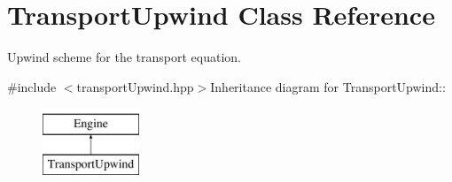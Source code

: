 \hypertarget{classTransportUpwind}{
\section{TransportUpwind Class Reference}
\label{classTransportUpwind}
}


Upwind scheme for the transport equation.  


{\ttfamily \#include $<$transportUpwind.hpp$>$}Inheritance diagram for TransportUpwind::\begin{figure}[H]
\begin{center}
\leavevmode
\includegraphics[height=2cm]{classTransportUpwind}
\end{center}
\end{figure}
